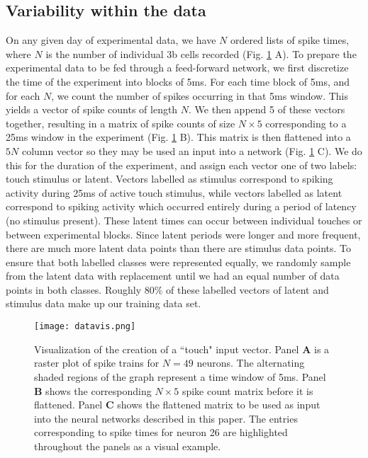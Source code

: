 \documentclass[12pt]{article}
\begin{document}
\subsection{Variability within the data}
\indent On any given day of experimental data, we have $N$ ordered lists of spike times, where $N$ is the number of individual 3b cells recorded (Fig. \ref{fig:datavis} A). To prepare the experimental data to be fed through a feed-forward network, we first discretize the time of the experiment into blocks of 5ms. For each time block of 5ms, and for each $N$, we count the number of spikes occurring in that 5ms window. This yields a vector of spike counts of length $N$. We then append 5 of these vectors together, resulting in a matrix of spike counts of size $N\times5$  corresponding to a 25ms window in the experiment (Fig. \ref{fig:datavis} B). This matrix is then flattened into a $5N$ column vector so they may be used an input into a network (Fig. \ref{fig:datavis} C). We do this for the duration of the experiment, and assign each vector one of two labels: touch stimulus or latent. Vectors labelled as stimulus correspond to spiking activity during 25ms of active touch stimulus, while vectors labelled as latent correspond to spiking activity which occurred entirely during a period of latency (no stimulus present). These latent times can occur between individual touches or between experimental blocks. Since latent periods were longer and more frequent, there are much more latent data points than there are stimulus data points. To ensure that both labelled classes were represented equally, we randomly sample from the latent data with replacement until we had an equal number of data points in both classes. Roughly $80\%$ of these labelled vectors of latent and stimulus data make up our training data set. \\
\begin{figure}
  \centering
  \texttt{[image: datavis.png]}
  \caption{Visualization of the creation of a ``touch" input vector. Panel \textbf{A} is a raster plot of spike trains for $N=49$ neurons. The alternating shaded regions of the graph represent a time window of 5ms. Panel \textbf{B} shows the corresponding $N\times5$ spike count matrix before it is flattened. Panel \textbf{C} shows the flattened matrix to be used as input into the neural networks described in this paper. The entries corresponding to spike times for neuron 26 are highlighted throughout the panels as a visual example.}
  \label{fig:datavis}
\end{figure}
\end{document}
